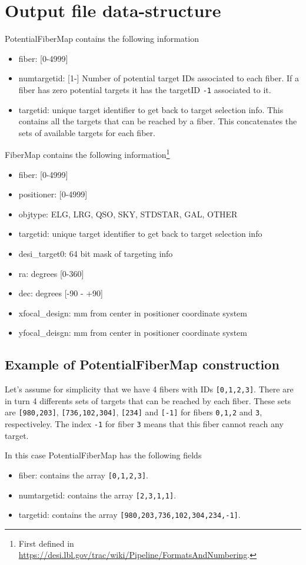 \documentclass{article}
\begin{document}
\section{Output file data-structure}


PotentialFiberMap contains the following information
\begin{itemize}
\item fiber: [0-4999]
\item numtargetid: [1-] Number of potential target IDs associated to each
  fiber. If a fiber has zero potential targets it has the
  targetID \texttt{-1} associated to it. 
\item targetid:  unique target identifier to get back to target
      selection info. This contains  all the targets that can be
      reached by a fiber. This concatenates the sets of available
      targets for each fiber.
\end{itemize}

\noindent
FiberMap contains the following information\footnote{First defined in
  \url{https://desi.lbl.gov/trac/wiki/Pipeline/FormatsAndNumbering}.} 
\begin{itemize}
    \item fiber: [0-4999]
    \item positioner: [0-4999]
    \item objtype: ELG, LRG, QSO, SKY, STDSTAR, GAL, OTHER
    \item targetid: 
      unique target identifier to get back to target
      selection info 
    \item desi\_target0: 64 bit mask of targeting info 
    \item ra: degrees [0-360] 
    \item dec: degrees [-90 - +90] 
    \item xfocal\_design: mm from center in positioner coordinate system 
    \item yfocal\_deisgn: mm from center in positioner coordinate system  
\end{itemize}



\subsection{Example of PotentialFiberMap construction}
Let's assume for simplicity that we have 4 fibers with IDs
\texttt{[0,1,2,3]}. There are in turn 4 differents sets of targets that
can be reached by each fiber. These sets are \texttt{[980,203]},
\texttt{[736,102,304]}, \texttt{[234]} and \texttt{[-1]} for fibers
\texttt{0,1,2} and \texttt{3}, respectiveley.
The index \texttt{-1} for fiber \texttt{3} means that this fiber
cannot reach any target.

In this case PotentialFiberMap has the following fields
\begin{itemize}
\item
fiber: contains the array \texttt{[0,1,2,3]}.
\item
numtargetid: contains the array \texttt{[2,3,1,1]}.
\item
targetid: contains the array \texttt{[980,203,736,102,304,234,-1]}.

\end{itemize}
\end{document}
